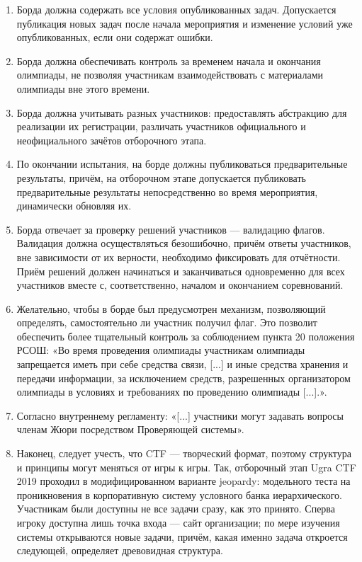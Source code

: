 \begin{enumerate}

\item
  Борда должна содержать все условия опубликованных задач. Допускается публикация новых задач после начала мероприятия и изменение условий уже опубликованных, если они содержат ошибки.

\item Борда должна обеспечивать контроль за временем начала и окончания олимпиады, не позволяя участникам взаимодействовать с материалами олимпиады вне этого времени.

\item Борда должна учитывать разных участников: предоставлять абстракцию для реализации их регистрации, различать участников официального и неофициального зачётов отборочного этапа.

\item По окончании испытания, на борде должны публиковаться предварительные результаты, причём, на отборочном этапе допускается публиковать предварительные результаты непосредственно во время мероприятия, динамически обновляя их.

\item
  Борда отвечает за проверку решений участников — валидацию флагов. Валидация должна осуществляться безошибочно, причём ответы участников, вне зависимости от их верности, необходимо фиксировать для отчётности. Приём решений должен начинаться и заканчиваться одновременно для всех участников вместе с, соответственно, началом и окончанием соревнований.

\item
  Желательно, чтобы в борде был предусмотрен механизм, позволяющий определять, самостоятельно ли участник получил флаг. Это позволит обеспечить более тщательный контроль за соблюдением пункта 20 положения РСОШ: «Во время проведения олимпиады участникам олимпиады запрещается иметь при себе средства связи, [...] и иные средства хранения и передачи информации, за исключением средств, разрешенных организатором олимпиады в условиях и требованиях по проведению олимпиады [...].»\cite{Rosolymp}.

\item Согласно внутреннему регламенту: «[...] участники могут задавать вопросы членам Жюри посредством Проверяющей системы»\cite{Olymp}.

\item Наконец, следует учесть, что CTF --- творческий формат, поэтому структура и принципы могут меняться от игры к игры. Так, отборочный этап Ugra CTF 2019 проходил в модифицированном варианте jeopardy: модельного теста на проникновения в корпоративную систему условного банка иерархического. Участникам были доступны не все задачи сразу, как это принято. Сперва игроку доступна лишь точка входа --- сайт организации; по мере изучения системы открываются новые задачи, причём, какая именно задача откроется следующей, определяет древовидная структура\cite{UgraCTF19Q}.

\end{enumerate}

